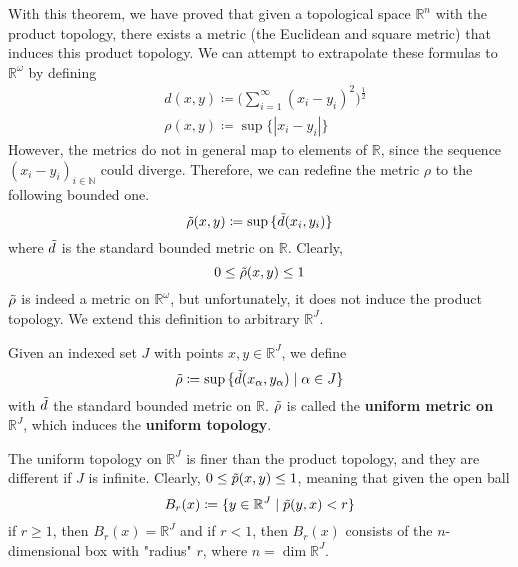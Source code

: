   With this theorem, we have proved that given a topological space $\mathbb{R}^n$ with the product topology, there exists a metric (the Euclidean and square metric) that induces this product topology. We can attempt to extrapolate these formulas to $\mathbb{R}^\omega$ by defining
  \begin{align*}
    & d(x, y) \coloneqq \bigg(\sum_{i=1}^\infty (x_i - y_i)^2 \bigg)^{\frac{1}{2}} \\
    & \rho(x, y) \coloneqq \sup{\{|x_i - y_i|\}}
  \end{align*}
  However, the metrics do not in general map to elements of $\mathbb{R}$, since the sequence $(x_i - y_i)_{i \in \mathbb{N}}$ could diverge. Therefore, we can redefine the metric $\rho$ to the following bounded one. 
  \begin{equation}
    \Tilde{\rho} (x, y) \coloneqq \sup{\{\Tilde{d}(x_i, y_i)\}}
  \end{equation}
  where $\Tilde{d}$ is the standard bounded metric on $\mathbb{R}$. Clearly,
  \begin{equation}
    0 \leq \Tilde{\rho}(x, y) \leq 1
  \end{equation}
  $\Tilde{\rho}$ is indeed a metric on $\mathbb{R}^\omega$, but unfortunately, it does not induce the product topology. We extend this definition to arbitrary $\mathbb{R}^J$. 
  
  \begin{definition}
    Given an indexed set $J$ with points $x, y \in \mathbb{R}^J$, we define
    \begin{equation}
      \Tilde{\rho} \coloneqq \sup{\{\Tilde{d}(x_\alpha, y_\alpha)\;|\; \alpha \in J\}}
    \end{equation}
    with $\Tilde{d}$ the standard bounded metric on $\mathbb{R}$. $\Tilde{\rho}$ is called the \textbf{uniform metric on $\mathbb{R}^J$}, which induces the \textbf{uniform topology}. 
  \end{definition}

  The uniform topology on $\mathbb{R}^J$ is finer than the product topology, and they are different if $J$ is infinite. Clearly, $0 \leq \Tilde{p} (x, y) \leq 1$, meaning that given the open ball
  \begin{equation}
    B_r (x) \coloneqq \{y \in \mathbb{R}^J \;|\; \Tilde{p}(y, x) < r\}
  \end{equation}
  if $r \geq 1$, then $B_r (x) = \mathbb{R}^J$ and if $r<1$, then $B_r (x)$ consists of the $n$-dimensional box with "radius" $r$, where $n = \dim{\mathbb{R}^J}$. 


